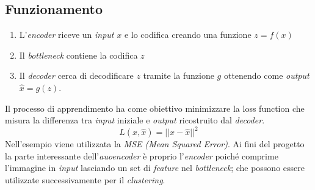 \subsection{Funzionamento}
\begin{enumerate}
    \item L'\emph{encoder} riceve un \emph{input} \( x \) e lo codifica creando una funzione \( z= f(x) \)
    \item Il \emph{bottleneck} contiene la codifica \( z \)
    \item Il \emph{decoder} cerca di decodificare \( z \) tramite la funzione \( g \) ottenendo come \emph{output} \( \hat{x} = g(z) \).
\end{enumerate}
Il processo di apprendimento ha come obiettivo minimizzare la loss function che misura la differenza tra \emph{input} iniziale e \emph{output} ricostruito dal \emph{decoder}.
\[ L(x, \hat{x}) = ||x - \hat{x}||^2 \]
Nell'esempio viene utilizzata la \emph{MSE (Mean Squared Error)}.
Ai fini del progetto la parte interessante dell'\emph{auoencoder} è proprio l'\emph{encoder} poiché comprime l'immagine in \emph{input} lasciando un set di \emph{\gls{feature}} nel \emph{bottleneck}; che possono essere utilizzate successivamente per il \emph{clustering}.








